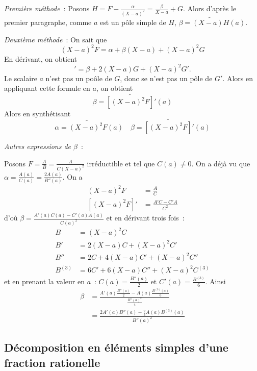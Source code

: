 \emph{Première méthode}~: Posons \(H=F-\frac{\alpha}{(X-a)^2}=\frac{\beta}{X-a}+G\). Alors d'après le premier paragraphe, comme \(a\) est un pôle simple de \(H\), \(\beta=\widetilde{(X-a)H}(a)\).

\emph{Deuxième méthode}~: On sait que
\begin{equation}
  (X-a)^2F=\alpha+\beta(X-a)+(X-a)^2G
\end{equation}
En dérivant, on obtient
\begin{equation}
  [(X-a)^2F]'=\beta+2(X-a)G+(X-a)^2G'.
\end{equation}
Le scalaire \(a\) n'est pas un poôle de \(G\), donc se n'est pas un pôle de \(G'\). Alors en appliquant cette formule en \(a\), on obtient
\begin{equation}
  \beta = \widetilde{[(X-a)^2F]'}(a)
\end{equation}
Alors en synthétisant
\begin{equation}
  \alpha=\widetilde{(X-a)^2F}(a) \quad  \beta = \widetilde{[(X-a)^2F]'}(a)
\end{equation}

\emph{Autres expressions de \(\beta\)}~:

Posons \(F = \frac{A}{B}=\frac{A}{C(X-a)^2}\) irréductible et tel que \(C(a)\neq 0\). On a déjà vu que \(\alpha=\frac{A(a)}{C(a)}=\frac{2A(a)}{B''(a)}\). On a
\begin{align}
  (X-a)^2F&=\frac{A}{C}\\
  [(X-a)^2F]' &=\frac{A'C-C'A}{C^2}
\end{align}
d'où \(\beta = \frac{A'(a)C(a)-C'(a)A(a)}{C(a)^2}\) et en dérivant trois fois~:
\begin{align}
  B&=(X-a)^2C \\
  B'&=2(X-a)C+(X-a)^2C'\\
  B''&=2C+4(X-a)C'+(X-a)^2C''\\
  B^{(3)}&=6C'+6(X-a)C''+(X-a)^2C^{(3)}
\end{align}
et en prenant la valeur en \(a\)~: \(C(a)=\frac{B''(a)}{2}\) et \(C'(a)=\frac{B^{(3)}}{6}\). Ainsi
\begin{align}
  \beta &= \frac{A'(a)\frac{B''(a)}{2}-A(a)\frac{B^{(3)}(a)}{6}}{\frac{B''(a)^2}{4}}\\
  &=\frac{2A'(a)B''(a)-\frac{2}{3}A(a)B^{(3)}(a)}{B''(a)^2}
\end{align}

\subsection[Décomposition en éléments simples]{Décomposition en éléments simples d'une fraction rationelle}

